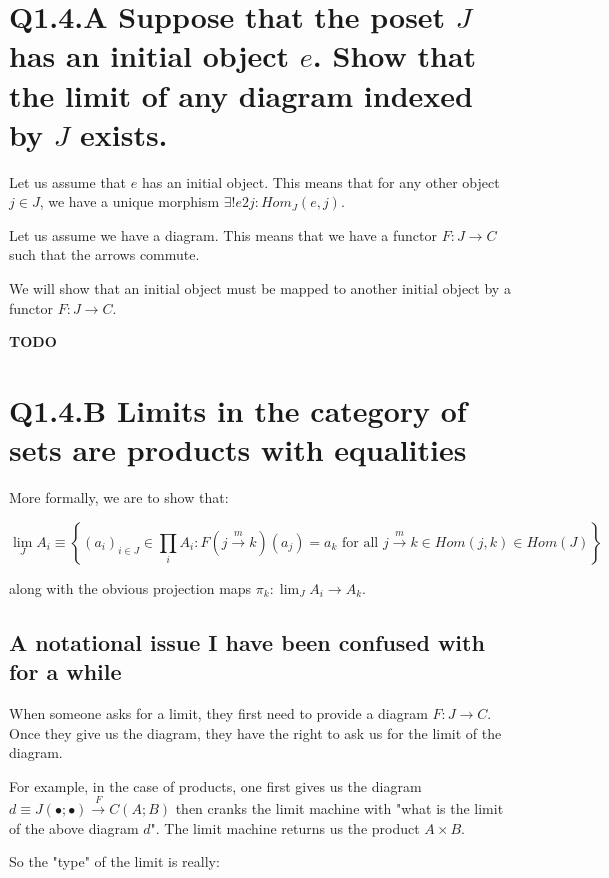 \documentclass{book}
\theoremstyle{definition}
\begin{document}
\section{Q1.4.A Suppose that the poset $J$ has an initial object $e$. Show that the limit of any diagram indexed by $J$ exists.}

Let us assume that $e$ has an initial object. This means that for any other object
$j \in J$, we have a unique morphism $\exists ! e2j: Hom_J(e, j)$.

Let us assume we have a diagram. This means that we have a functor $F: J \rightarrow C$
such that the arrows commute.

We will show that an initial object must be mapped to another initial object by a
functor $F: J \rightarrow C$.

\textbf{TODO}


\section{Q1.4.B  Limits in the category of sets are products with equalities}

More formally, we are to show that:

$$
\lim_J A_i \equiv \left\{ (a_i)_{i \in J} \in \prod_{i} A_i : 
 F(j \xrightarrow{m} k)(a_j) = a_k \text{ for all } j \xrightarrow{m} k \in Hom(j, k) \in Hom(J)
 \right\}
$$

along with the obvious projection maps $\pi_k: \lim_J A_i \rightarrow A_k$.



\subsection{A notational issue I have been confused with for a while}

When someone asks for a limit, they first need to provide a diagram $F: J \rightarrow C$.
Once they give us the diagram, they have the right to ask us for the limit of
the diagram.

For example, in the case of products, one first gives us the diagram
$d \equiv J(\bullet ; \bullet) \xrightarrow{F} C(A ; B)$ then
cranks the limit machine with "what is the limit of the above diagram $d$".
The limit machine returns us the product $A \times B$.

So the "type" of the limit is really:
\end{document}
